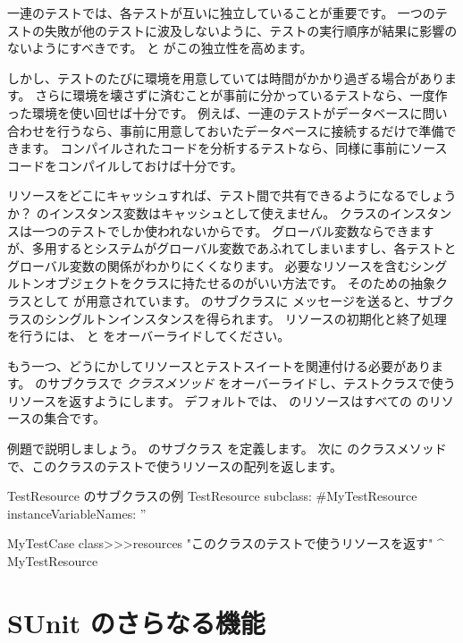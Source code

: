 \documentclass[a4paper,10pt,twoside]{book}
\begin{document}
一連のテストでは、各テストが互いに独立していることが重要です。
一つのテストの失敗が他のテストに波及しないように、テストの実行順序が結果に影響のないようにすべきです。
 と  がこの独立性を高めます。

しかし、テストのたびに環境を用意していては時間がかかり過ぎる場合があります。
さらに環境を壊さずに済むことが事前に分かっているテストなら、一度作った環境を使い回せば十分です。
例えば、一連のテストがデータベースに問い合わせを行うなら、事前に用意しておいたデータベースに接続するだけで準備できます。
コンパイルされたコードを分析するテストなら、同様に事前にソースコードをコンパイルしておけば十分です。

リソースをどこにキャッシュすれば、テスト間で共有できるようになるでしょうか？
 のインスタンス変数はキャッシュとして使えません。
 クラスのインスタンスは一つのテストでしか使われないからです。
グローバル変数ならできますが、多用するとシステムがグローバル変数であふれてしまいますし、各テストとグローバル変数の関係がわかりにくくなります。
必要なリソースを含むシングルトンオブジェクトをクラスに持たせるのがいい方法です。
そのための抽象クラスとして  が用意されています。
 のサブクラスに  メッセージを送ると、サブクラスのシングルトンインスタンスを得られます。
リソースの初期化と終了処理を行うには、  と  をオーバーライドしてください。

もう一つ、どうにかしてリソースとテストスイートを関連付ける必要があります。
 のサブクラスで  \emph{クラスメソッド} をオーバーライドし、テストクラスで使うリソースを返すようにします。
\ab{}
デフォルトでは、  のリソースはすべての  のリソースの集合です。

例題で説明しましょう。
 のサブクラス  を定義します。
次に  のクラスメソッド  で、このクラスのテストで使うリソースの配列を返します。

\begin{classdef}[mytestresource]{TestResource のサブクラスの例}
TestResource subclass: #MyTestResource
	instanceVariableNames: ''

MyTestCase class>>>resources
	"このクラスのテストで使うリソースを返す"
	^{ MyTestResource }
\end{classdef}

\section{SUnit のさらなる機能}
\end{document}
